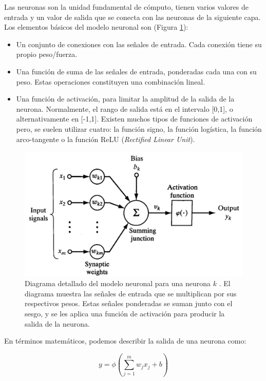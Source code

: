 Las neuronas son la unidad fundamental de cómputo, tienen varios valores de entrada y un valor de salida que se conecta con las neuronas de la siguiente capa. Los elementos básicos del modelo neuronal son (Figura \ref{fig5}):

\begin{itemize}
	\item Un conjunto de conexiones con las señales de entrada. Cada conexión tiene su propio peso/fuerza.
	\item Una función de suma de las señales de entrada, ponderadas cada una con su peso. Estas operaciones constituyen una combinación lineal.
	\item Una función de activación, para limitar la amplitud de la salida de la neurona. Normalmente, el rango de salida está en el intervalo [0,1], o alternativamente en [-1,1]. Existen muchos tipos de funciones de activación pero, se suelen utilizar cuatro: la función signo, la función logística, la función arco-tangente o la función ReLU (\textit{Rectified Linear Unit}).
\end{itemize} 

\begin{figure}[h]
	\centering
	\includegraphics[scale=0.25]{imagenes/cap2/neuron-model.png}
	\caption[Digrama del modelo neuronal.]{Diagrama detallado del modelo neuronal para una neurona $k$ \cite{25}. El diagrama muestra las señales de entrada que se multiplican por sus respectivos pesos. Estas señales ponderadas se suman junto con el sesgo, y se les aplica una función de activación para producir la salida de la neurona.}
	\label{fig5}
\end{figure}

En términos matemáticos, podemos describir la salida de una neurona como:

\begin{equation}
	y = \phi(\sum_{j=1}^{m} w_j x_j + b)
\end{equation}

